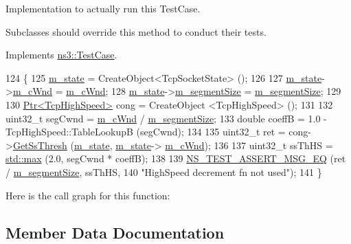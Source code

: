 Implementation to actually run this Test\+Case. 

Subclasses should override this method to conduct their tests. 

Implements \hyperlink{classns3_1_1TestCase_a8ff74680cf017ed42011e4be51917a24}{ns3\+::\+Test\+Case}.


\begin{DoxyCode}
124 \{
125   \hyperlink{classTcpHighSpeedDecrementTest_ae055a8587feb7f7ae03383e7eb6938da}{m\_state} = CreateObject<TcpSocketState> ();
126 
127   \hyperlink{classTcpHighSpeedDecrementTest_ae055a8587feb7f7ae03383e7eb6938da}{m\_state}->\hyperlink{classns3_1_1TcpSocketState_a7cd3d2156a483c1db436097477a0fd7f}{m\_cWnd} = \hyperlink{classTcpHighSpeedDecrementTest_aaf98ad76a6392e76f446aa8457dc501c}{m\_cWnd};
128   \hyperlink{classTcpHighSpeedDecrementTest_ae055a8587feb7f7ae03383e7eb6938da}{m\_state}->\hyperlink{classns3_1_1TcpSocketState_a079872f7b0099ef5f3cab4ff47bd2edd}{m\_segmentSize} = \hyperlink{classTcpHighSpeedDecrementTest_a433f5dc10ea2d739a6f628ee0bda1582}{m\_segmentSize};
129 
130   \hyperlink{classns3_1_1Ptr}{Ptr<TcpHighSpeed>} cong = CreateObject <TcpHighSpeed> ();
131 
132   uint32\_t segCwnd = \hyperlink{classTcpHighSpeedDecrementTest_aaf98ad76a6392e76f446aa8457dc501c}{m\_cWnd} / \hyperlink{classTcpHighSpeedDecrementTest_a433f5dc10ea2d739a6f628ee0bda1582}{m\_segmentSize};
133   \textcolor{keywordtype}{double} coeffB = 1.0 - TcpHighSpeed::TableLookupB (segCwnd);
134 
135   uint32\_t ret = cong->\hyperlink{classns3_1_1TcpHighSpeed_abc432f29ca437f1a62cd17d614568842}{GetSsThresh} (\hyperlink{classTcpHighSpeedDecrementTest_ae055a8587feb7f7ae03383e7eb6938da}{m\_state}, \hyperlink{classTcpHighSpeedDecrementTest_ae055a8587feb7f7ae03383e7eb6938da}{m\_state}->
      \hyperlink{classns3_1_1TcpSocketState_a7cd3d2156a483c1db436097477a0fd7f}{m\_cWnd});
136 
137   uint32\_t ssThHS = \hyperlink{80211b_8c_affe776513b24d84b39af8ab0930fef7f}{std::max} (2.0, segCwnd * coeffB);
138 
139   \hyperlink{group__testing_ga2a9d78cffb3db8e867c35fff0b698cf5}{NS\_TEST\_ASSERT\_MSG\_EQ} (ret / \hyperlink{classTcpHighSpeedDecrementTest_a433f5dc10ea2d739a6f628ee0bda1582}{m\_segmentSize}, ssThHS,
140                          \textcolor{stringliteral}{"HighSpeed decrement fn not used"});
141 \}
\end{DoxyCode}


Here is the call graph for this function\+:




\subsection{Member Data Documentation}
